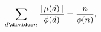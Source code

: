 \[\sum_{d\divides n}\frac{|\mathop{\mu\/}\nolimits\!\left(d\right)|}{\mathop{%
\phi\/}\nolimits\!\left(d\right)}=\frac{n}{\mathop{\phi\/}\nolimits\!\left(n%
\right)},\]